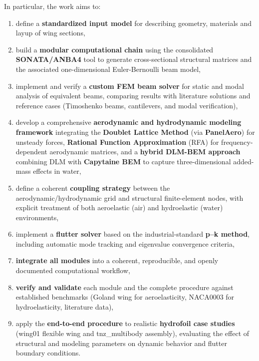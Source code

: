 In particular, the work aims to:
\begin{enumerate}
    \item define a \textbf{standardized input model} for describing geometry, materials and layup of wing sections,
    \item build a \textbf{modular computational chain} using the consolidated \textbf{SONATA/ANBA4} tool to generate cross-sectional structural matrices and the associated one-dimensional Euler-Bernoulli beam model,
    \item implement and verify a \textbf{custom FEM beam solver} for static and modal analysis of equivalent beams, comparing results with literature solutions and reference cases (Timoshenko beams, cantilevers, and modal verification),
    \item develop a comprehensive \textbf{aerodynamic and hydrodynamic modeling framework} integrating the \textbf{Doublet Lattice Method} (via \textbf{PanelAero}) for unsteady forces, \textbf{Rational Function Approximation} (RFA) for frequency-dependent aerodynamic matrices, and a \textbf{hybrid DLM-BEM approach} combining DLM with \textbf{Capytaine BEM} to capture three-dimensional added-mass effects in water,
    \item define a coherent \textbf{coupling strategy} between the aerodynamic/hydrodynamic grid and structural finite-element nodes, with explicit treatment of both aeroelastic (air) and hydroelastic (water) environments,
    \item implement a \textbf{flutter solver} based on the industrial-standard \textbf{p--k method}, including automatic mode tracking and eigenvalue convergence criteria,
    \item \textbf{integrate all modules} into a coherent, reproducible, and openly documented computational workflow,
    \item \textbf{verify and validate} each module and the complete procedure against established benchmarks (Goland wing for aeroelasticity, NACA0003 for hydroelasticity, literature data),
    \item apply the \textbf{end-to-end procedure} to realistic \textbf{hydrofoil case studies} (wing01 flexible wing and tnz\_multibody assembly), evaluating the effect of structural and modeling parameters on dynamic behavior and flutter boundary conditions.
\end{enumerate}

